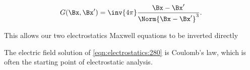 \begin{dmath}\label{eqn:electrostatics:260}
G(\Bx, \Bx') = \inv{4 \pi} \frac{\Bx - \Bx'}{\Norm{\Bx - \Bx'}^3}.
\end{dmath}

This allows our two electrostatics Maxwell equations to be inverted directly


The electric field solution of \cref{eqn:electrostatics:280} is Coulomb's law, which is often the starting point of electrostatic analysis.
